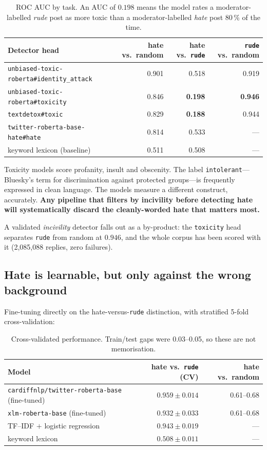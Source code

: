 \documentclass[11pt,a4paper]{article}
\begin{document}
\begin{table}[h]
\centering
\begin{tabular}{lrrr}
\toprule
Detector head & hate vs.\ random & hate vs.\ \texttt{rude} & \texttt{rude} vs.\ random \\
\midrule
\texttt{unbiased-toxic-roberta\#identity\_attack} & 0.901 & 0.518 & 0.919 \\
\texttt{unbiased-toxic-roberta\#toxicity}         & 0.846 & \textbf{0.198} & \textbf{0.946} \\
\texttt{textdetox\#toxic}                         & 0.829 & \textbf{0.188} & 0.944 \\
\texttt{twitter-roberta-base-hate\#hate}          & 0.814 & 0.533 & --- \\
keyword lexicon (baseline)                        & 0.511 & 0.508 & --- \\
\bottomrule
\end{tabular}
\caption{ROC AUC by task. An AUC of $0.198$ means the model rates a
moderator-labelled \emph{rude} post as more toxic than a moderator-labelled
\emph{hate} post 80\,\% of the time.}
\end{table}

Toxicity models score profanity, insult and obscenity. The label
\texttt{intolerant}---Bluesky's term for discrimination against protected
groups---is frequently expressed in clean language. The models measure a different
construct, accurately. \textbf{Any pipeline that filters by incivility before
detecting hate will systematically discard the cleanly-worded hate that matters
most.}

A validated \emph{incivility} detector falls out as a by-product: the
\texttt{toxicity} head separates \texttt{rude} from random at $0.946$, and the whole
corpus has been scored with it (2{,}085{,}088 replies, zero failures).

\subsection{Hate is learnable, but only against the wrong background}

Fine-tuning directly on the hate-versus-\texttt{rude} distinction, with stratified
5-fold cross-validation:

\begin{table}[h]
\centering
\begin{tabular}{lrr}
\toprule
Model & hate vs.\ \texttt{rude} (CV) & hate vs.\ random \\
\midrule
\texttt{cardiffnlp/twitter-roberta-base} (fine-tuned) & $0.959 \pm 0.014$ & 0.61--0.68 \\
\texttt{xlm-roberta-base} (fine-tuned)                & $0.932 \pm 0.033$ & 0.61--0.68 \\
TF--IDF $+$ logistic regression                        & $0.943 \pm 0.019$ & --- \\
keyword lexicon                                        & $0.508 \pm 0.011$ & --- \\
\bottomrule
\end{tabular}
\caption{Cross-validated performance. Train/test gaps were 0.03--0.05, so these are
not memorisation.}
\end{table}
\end{document}
